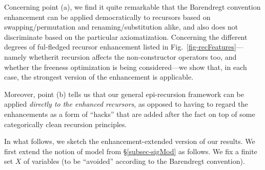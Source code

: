 Concerning point (a), 
we find it quite remarkable that the Barendregt convention enhancement can be applied democratically to recursors based on swapping/permutation and renaming/substitution alike, and also does not discriminate based on the particular axiomatization.  
%
Concerning the different degrees of ful-fledged recursor enhancement listed in Fig.~\ref{fig-recFeatures}---%
namely whetherit recursion affects the non-constructor operators too, and whether the  freeness optimization is being considered---we show that, in each case, the strongest version of the enhancement is applicable. 

Moreover, point (b) tells us that our general epi-recursion framework can be applied \emph{directly to the enhanced recursors}, as opposed to having to regard the enhancements as a form of ``hacks'' that are added after the fact on top of some categorically clean recursion principles. 

In what follows, we sketch the enhancement-extended version of our results. 
%
%
We first extend the notion of model from \S\ref{subsec-sigMod} as follows. 
We fix a finite set $X$ of variables (to be ``avoided'' according to the Barendregt convention). 
%

